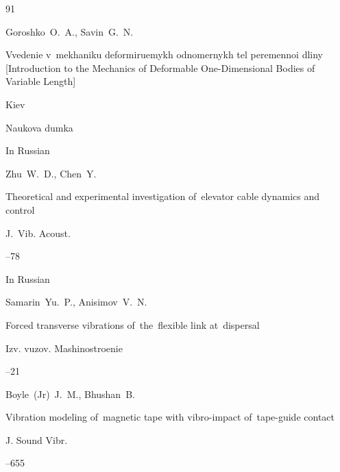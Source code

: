 \begin{thebibliography}{91}




\by Goroshko~O.~A., Savin~G.~N.

\book Vvedenie v~mekhaniku deformiruemykh odnomernykh tel peremennoi dliny \rm [Introduction to the Mechanics of Deformable One-Dimensional Bodies of Variable Length]

\publaddr Kiev

\publ Naukova dumka



\lang In Russian




\by Zhu~W.~D., Chen~Y.

\paper Theoretical and experimental investigation of~elevator cable dynamics and control

\jour J.~Vib. Acoust.




--78







\lang In Russian

\by Samarin~Yu.~P., Anisimov~V.~N.

\paper Forced transverse vibrations of~the~flexible link at~dispersal

\jour Izv. vuzov. Mashinostroenie



--21




\by Boyle~(Jr)~J.~M., Bhushan~B.

\paper Vibration modeling of~magnetic tape with vibro-impact of~tape-guide contact

\jour J. Sound Vibr.




--655


\end{thebibliography}
